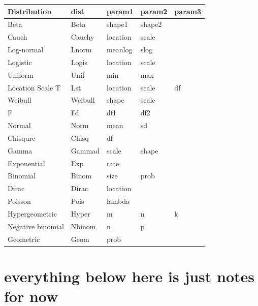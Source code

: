\documentclass{article}\usepackage[]{graphicx}\usepackage[]{color}
\begin{document}
\newpage
\begin{center}
    \begin{tabular}{ l l  p{2cm}  p{2cm}  p{2cm}}
    \hline
    \textbf{Distribution} & \textbf{dist} & \textbf{param1} & \textbf{param2} & 
    \textbf{param3} \newline \\ \hline
    Beta & Beta & shape1 & shape2 &  \\ 
    Cauch & Cauchy & location & scale &  \\
    Log-normal & Lnorm & meanlog & slog &  \\
    Logistic & Logis & location & scale &  \\
    Uniform & Unif & min & max &  \\
    Location Scale T & Lst & location & scale & df \\
    Weibull & Weibull & shape & scale &  \\
    F & Fd & df1 & df2 &  \\
    Normal & Norm & mean & sd &  \\
    Chisqure & Chisq & df &  &  \\
    Gamma & Gammad & scale & shape &  \\
    Exponential & Exp & rate &  &  \\
    Binomial & Binom & size & prob &  \\
    Dirac & Dirac & location &  &  \\
    Poisson & Pois & lambda &  &  \\
    Hypergeometric & Hyper & m & n & k \\
    Negative binomial & Nbinom & n & p &  \\
    Geometric & Geom & prob &  &  \\ \hline
    \end{tabular}
\end{center}















\newpage 

\section*{everything below here is just notes for now}
\end{document}
